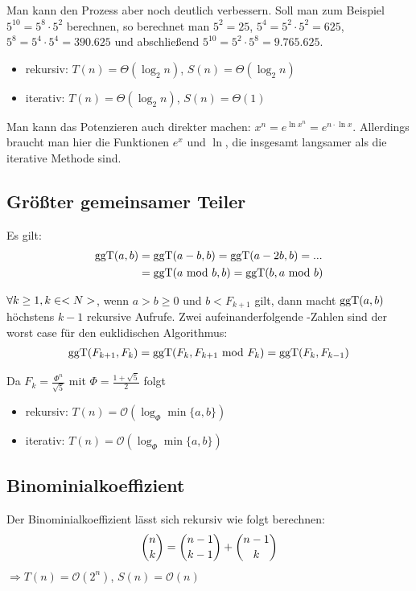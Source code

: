 Man kann den Prozess aber noch deutlich verbessern. Soll man zum Beispiel $5^{10}=5^8\cdot 5^2$ berechnen, so berechnet man $5^2=25$, $5^4=5^2\cdot 5^2=625$, $5^8=5^4\cdot 5^4=390.625$ und abschließend $5^{10}=5^2\cdot 5^8=9.765.625$.
\begin{itemize}
	\item rekursiv: $T(n)=\Theta(\log_2 n)$, $S(n)=\Theta(\log_2 n)$
	\item iterativ: $T(n)=\Theta(\log_2 n)$, $S(n)=\Theta(1)$
\end{itemize}

Man kann das Potenzieren auch direkter machen: $x^n=e^{\ln x^n}=e^{n\cdot\ln x}$. Allerdings braucht man hier die Funktionen $e^x$ und $\ln$, die insgesamt langsamer als die iterative Methode sind.

\subsection{Größter gemeinsamer Teiler}
Es gilt:
\begin{align}
	\operatorname{ggT}(a,b) &= \operatorname{ggT}(a-b,b) = \operatorname{ggT}(a-2b,b) = ... \notag \\
	&= \operatorname{ggT}(a\text{ mod } b,b) = \operatorname{ggT}(b, a\text{ mod } b) \notag
\end{align}

\begin{proposition}
	$\forall k\ge 1,k\in<N>$, wenn $a>b\ge 0$ und $b<F_{k+1}$ gilt, dann macht $\operatorname{ggT}(a,b)$ höchstens $k-1$ rekursive Aufrufe. Zwei aufeinanderfolgende -Zahlen sind der worst case für den euklidischen Algorithmus:
	\begin{align}
		\operatorname{ggT}(F_{k+1},F_k) = \operatorname{ggT}(F_k,F_{k+1}\text{ mod } F_k) = \operatorname{ggT}(F_k,F_{k-1})\notag
	\end{align}
\end{proposition}
Da $F_k=\frac{\Phi^n}{\sqrt{5}}$ mit $\Phi=\frac{1+\sqrt{5}}{2}$ folgt
\begin{itemize}
	\item rekursiv: $T(n)=\mathcal{O}(\log_\Phi\min\{a,b\})$
	\item iterativ: $T(n)=\mathcal{O}(\log_\Phi\min\{a,b\})$
\end{itemize}

\subsection{Binominialkoeffizient}

Der Binominialkoeffizient lässt sich rekursiv wie folgt berechnen:
\begin{align}
	\binom{n}{k} = \binom{n-1}{k-1}+\binom{n-1}{k}\notag
\end{align}
$\Rightarrow T(n)=\mathcal{O}(2^n)$, $S(n)=\mathcal{O}(n)$

